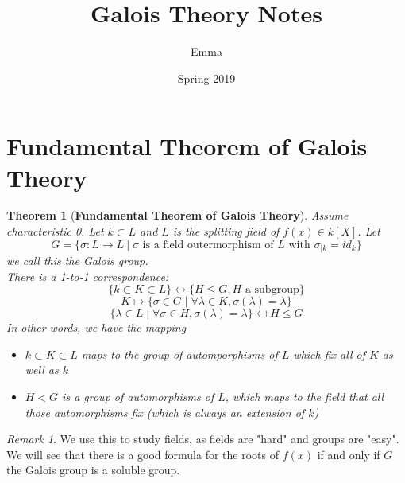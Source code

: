 \documentclass{article}
\title{Galois Theory Notes}
\author{Emma}
\date{Spring 2019}
\theoremstyle{definition}
\theoremstyle{plain}%
\newtheorem{thm}{Theorem}[section]
\theoremstyle{remark}
\newtheorem*{rem}{Remark}
\begin{document}
\maketitle

\tableofcontents

\section{Fundamental Theorem of Galois Theory}

\begin{thm}[\textbf{Fundamental Theorem of Galois Theory}]
Assume characteristic 0. Let $k \subset L$ and $L$ is the splitting field of $f(x) \in k[X]$. Let \[G = \{\sigma : L \to L\ | \; \sigma \text{ is a field outermorphism of } L \text{ with } \sigma_{|k} = id_k\}\] we call this the Galois group. \\
There is a 1-to-1 correspondence: \[\{k \subset K \subset L\} \longleftrightarrow \{H \le G, H \text{ a subgroup}\}\]
\[K \mapsto \{\sigma \in G \; | \; \forall \lambda \in K, \sigma(\lambda) = \lambda\}\] \[\{\lambda \in L \; | \; \forall \sigma \in H, \sigma(\lambda) = \lambda\} \mapsfrom H \le G \]
In other words, we have the mapping
\begin{itemize}
    \item $k \subset K \subset L$ maps to the group of automporphisms of $L$ which fix all of $K$ as well as $k$
    \item $H < G$ is a group of automorphisms of $L$, which maps to the field that all those automorphisms fix (which is always an extension of $k$)
\end{itemize}
\end{thm}



\begin{rem}
We use this to study fields, as fields are "hard" and groups are "easy". We will see that there is a good formula for the roots of $f(x)$ if and only if $G$ the Galois group is a soluble group.
\end{rem}
\end{document}

